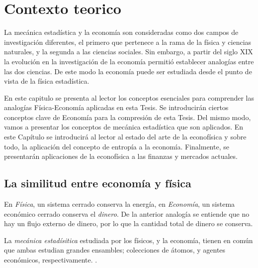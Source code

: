%
\chapter{Contexto teorico}
\label{contexto}



La mecánica estadística y la economía son consideradas como dos campos de investigación diferentes, el primero que pertenece a la rama de la física y ciencias naturales, y la segunda a las ciencias sociales.
Sin embargo, a partir del siglo XIX la evolución en la investigación de la economía permitió establecer analogías entre las dos ciencias.
De este modo la economía puede ser estudiada desde el punto de vista de la física estadística.

En este capitulo se presenta al lector los conceptos esenciales para comprender las analogías Física-Economía aplicadas en esta Tesis.
Se introducirán ciertos conceptos clave de Economía para la compresión de esta Tesis.
Del mismo modo, vamos a presentar los conceptos de mecánica estadística que son aplicados. 
En este Capítulo se introducirá al lector al estado del arte de la econofísica y sobre todo, la aplicación del concepto de entropía a la economía.
Finalmente, se presentarán aplicaciones de la econofísica a las finanzas y mercados actuales.

\section{La similitud entre economía y física}


En \textit{Física}, un sistema cerrado conserva la energía,  en \textit{Economía}, un sistema económico cerrado conserva el \textit{dinero}. 
De la anterior analogía se entiende que no hay un flujo externo de dinero, por lo que la cantidad total de dinero se conserva.

La \textit{mecánica estadísitica} estudiada por los físicos, y la economía, tienen en común que ambas estudian grandes ensambles; colecciones de átomos, y agentes económicos, respectivamente.
\citep[][pagina 149]{cottrell_classical_2009}.

